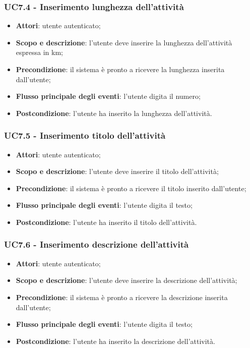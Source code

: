 \subsubsection{UC7.4 - Inserimento lunghezza dell’attività}
\begin{itemize}
	\item \textbf{Attori}: utente autenticato;
	\item \textbf{Scopo e descrizione}: l’utente deve inserire la lunghezza dell'attività espressa in km;
	\item \textbf{Precondizione}: il sistema è pronto a ricevere la lunghezza inserita dall’utente;
	\item \textbf{Flusso principale degli eventi}: l’utente digita il numero;
	\item \textbf{Postcondizione}: l’utente ha inserito la lunghezza dell’attività.
\end{itemize}

\subsubsection{UC7.5 - Inserimento titolo dell’attività }
\begin{itemize}
	\item \textbf{Attori}: utente autenticato;
	\item \textbf{Scopo e descrizione}: l’utente deve inserire il titolo dell'attività;
	\item \textbf{Precondizione}: il sistema è pronto a ricevere il titolo inserito dall’utente;
	\item \textbf{Flusso principale degli eventi}: l’utente digita il testo;
	\item \textbf{Postcondizione}: l’utente ha inserito il titolo dell’attività.
\end{itemize}

\subsubsection{UC7.6 - Inserimento descrizione dell’attività }
\begin{itemize}
	\item \textbf{Attori}: utente autenticato;
	\item \textbf{Scopo e descrizione}: l’utente deve inserire la descrizione dell'attività;
	\item \textbf{Precondizione}: il sistema è pronto a ricevere la descrizione inserita dall’utente;
	\item \textbf{Flusso principale degli eventi}: l’utente digita il testo;
	\item \textbf{Postcondizione}: l’utente ha inserito la descrizione dell’attività.
\end{itemize}


